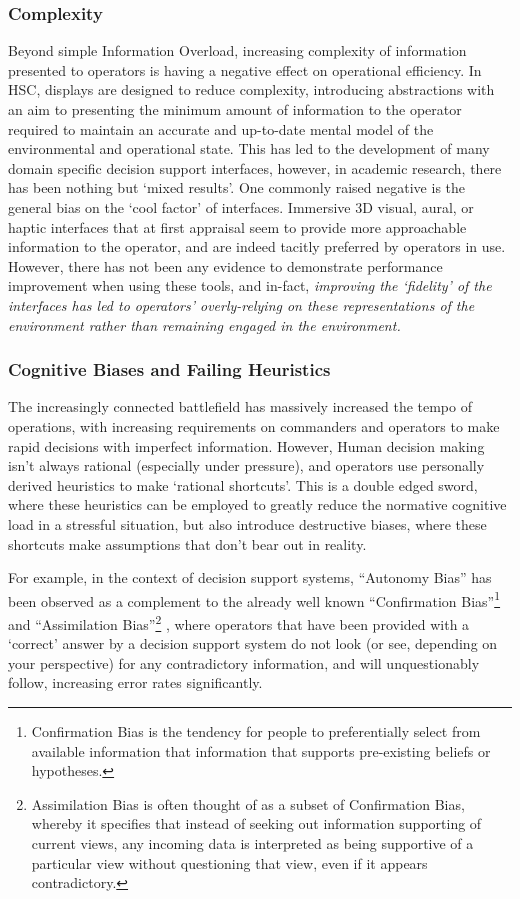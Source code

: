 \subsubsection{Complexity}
Beyond simple Information Overload, increasing complexity of information presented to operators is having a negative effect on operational efficiency. 
In HSC, displays are designed to reduce complexity, introducing abstractions with an aim to presenting the minimum amount of information to the operator required to maintain an accurate and up-to-date mental model of the environmental and operational state. This has led to the development of many domain specific decision support interfaces, however, in academic research, there has been nothing but ‘mixed results’.
One commonly raised negative is the general bias on the ‘cool factor’ of interfaces. Immersive 3D visual, aural, or haptic interfaces that at first appraisal seem to provide more approachable information to the operator, and are indeed tacitly preferred by operators in use. 
However, there has not been any evidence to demonstrate performance improvement when using these tools, and in-fact, \textit{improving the ‘fidelity’ of the interfaces has led to operators’ overly-relying on these representations of the environment rather than remaining engaged in the environment.}

\subsubsection{Cognitive Biases and Failing Heuristics}
The increasingly connected battlefield has massively increased the tempo of operations, with increasing requirements on commanders and operators to make rapid decisions with imperfect information. However, Human decision making isn’t always rational (especially under pressure), and operators use personally derived heuristics to make ‘rational shortcuts’. This is a double edged sword, where these heuristics can be employed to greatly reduce the normative cognitive load in a stressful situation, but also introduce destructive biases, where these shortcuts make assumptions that don’t bear out in reality.

For example, in the context of decision support systems, “Autonomy Bias” has been observed as a complement to the already well known “Confirmation Bias”\footnote{Confirmation Bias is the tendency for people to preferentially select from available information that information that supports pre-existing beliefs or hypotheses.}  and “Assimilation Bias”\footnote{Assimilation Bias is often thought of as a subset of Confirmation Bias, whereby it specifies that instead of seeking out information supporting of current views, any incoming data is interpreted as being supportive of a particular view without questioning that view, even if it appears contradictory.} , where operators that have been provided with a ‘correct’ answer by a decision support system do not look (or see, depending on your perspective) for any contradictory information, and will unquestionably follow, increasing error rates significantly. 

